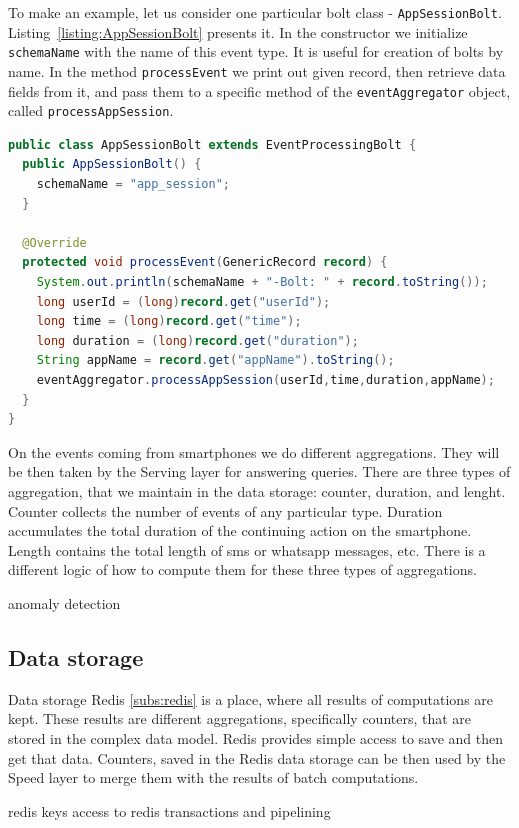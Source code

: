 To make an example, let us consider one particular bolt class - \lstinline{AppSessionBolt}.
Listing~\ref{listing:AppSessionBolt} presents it.
In the constructor we initialize \lstinline{schemaName} with the name of this event type.
It is useful for creation of bolts by name.
In the method \lstinline{processEvent} we print out given record, then retrieve data fields from it, and pass them to a specific method of the \lstinline{eventAggregator} object, called \lstinline{processAppSession}.

\begin{lstlisting}[float=h, caption=Implementation of AppSessionBolt class., label=listing:AppSessionBolt, language=Java]
public class AppSessionBolt extends EventProcessingBolt {
  public AppSessionBolt() {
    schemaName = "app_session";
  }

  @Override
  protected void processEvent(GenericRecord record) {
    System.out.println(schemaName + "-Bolt: " + record.toString());
    long userId = (long)record.get("userId");
    long time = (long)record.get("time");
    long duration = (long)record.get("duration");
    String appName = record.get("appName").toString();
    eventAggregator.processAppSession(userId,time,duration,appName);
  }
}
\end{lstlisting}

On the events coming from smartphones we do different aggregations.
They will be then taken by the Serving layer for answering queries.
There are three types of aggregation, that we maintain in the data storage: counter, duration, and lenght.
Counter collects the number of events of any particular type.
Duration accumulates the total duration of the continuing action on the smartphone.
Length contains the total length of sms or whatsapp messages, etc.
There is a different logic of how to compute them for these three types of aggregations. 

anomaly detection

\subsection{Data storage}

Data storage Redis \ref{subs:redis} is a place, where all results of computations are kept.
These results are different aggregations, specifically counters, that are stored in the complex data model.
Redis provides simple access to save and then get that data.
Counters, saved in the Redis data storage can be then used by the Speed layer to merge them with the results of batch computations.

redis
keys
access to redis
transactions and pipelining